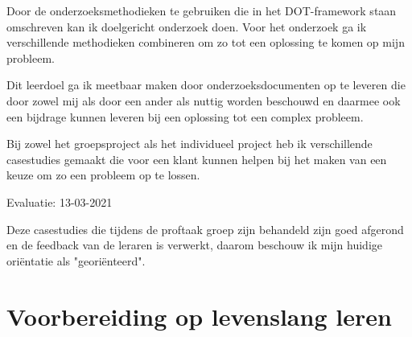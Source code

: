 Door de onderzoeksmethodieken te gebruiken die in het DOT-framework staan omschreven kan ik doelgericht onderzoek
doen.
Voor het onderzoek ga ik verschillende methodieken combineren om zo tot een oplossing te komen op mijn probleem.


Dit leerdoel ga ik meetbaar maken door onderzoeksdocumenten op te leveren die door zowel mij als door een ander als
nuttig worden beschouwd en daarmee ook een bijdrage kunnen leveren bij een oplossing tot een complex probleem.

Bij zowel het groepsproject als het individueel project heb ik verschillende casestudies gemaakt die voor een klant
kunnen helpen bij het maken van een keuze om zo een probleem op te lossen.

\bigskip
Evaluatie: 13-03-2021

Deze casestudies die tijdens de proftaak groep zijn behandeld zijn goed afgerond en de feedback van de leraren is
verwerkt, daarom beschouw ik mijn huidige oriëntatie als "georiënteerd".




\section{Voorbereiding op levenslang leren}\label{sec:voorbereiding-op-levenslang-leren}

